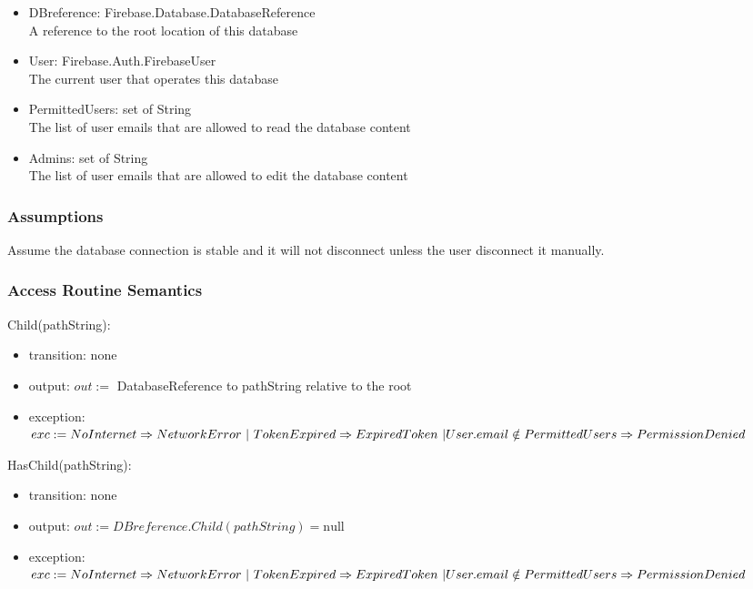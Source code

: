 \documentclass[12pt, titlepage]{article}
\begin{document}
\begin{itemize}
\item DBreference: Firebase.Database.DatabaseReference\\
A reference to the root location of this database
\item User: Firebase.Auth.FirebaseUser\\
The current user that operates this database
\item PermittedUsers: set of String\\
The list of user emails that are allowed to read the database content
\item Admins: set of String\\
The list of user emails that are allowed to edit the database content
\end{itemize}


\subsubsection{Assumptions}

Assume the database connection is stable and it will not disconnect unless the user disconnect it manually.

\subsubsection{Access Routine Semantics}

\noindent Child(pathString):
\begin{itemize}
\item transition: none 
\item output: $out :=$ DatabaseReference to pathString relative to the root
\item exception: $exc := NoInternet \Rightarrow NetworkError\ | \ TokenExpired \Rightarrow ExpiredToken\ | \\ User.email \notin PermittedUsers \Rightarrow PermissionDenied$
\end{itemize}

\noindent HasChild(pathString):
\begin{itemize}
\item transition: none 
\item output: $out := DBreference.Child(pathString) = \text{null}$
\item exception: $exc := NoInternet \Rightarrow NetworkError\ | \ TokenExpired \Rightarrow ExpiredToken\ | \\ User.email \notin PermittedUsers \Rightarrow PermissionDenied$
\end{itemize}
\end{document}
